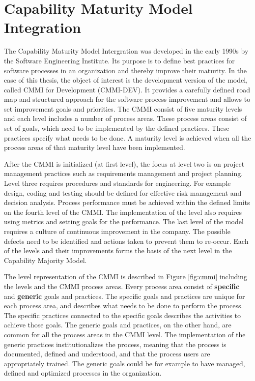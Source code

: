 \documentclass[12pt,a4paper,oneside,pdftex]{report}
\begin{document}
\section{Capability Maturity Model Integration}
The Capability Maturity Model Intergration was developed in the early 1990s by the Software Engineering Institute. Its purpose is to define best practices for software processes in an organization and thereby improve their maturity. In the case of this thesis, the object of interest is the development version of the model, called CMMI for Development (CMMI-DEV). It provides a carefully defined road map and  structured approach for the software process improvement and allows to set improvement goals and priorities. The CMMI consist of five maturity levels and each level includes a number of process areas. These process areas consist of set of goals, which need to be implemented by the defined practices. These practices specify what needs to be done. A maturity level is achieved when all the process areas of that maturity level have been implemented. \cite{RefWorks:29}

After the CMMI is initialized (at first level), the focus at level two is on project management practices such as requirements management and project planning. Level three requires procedures and standards for engineering. For example design, coding and testing should be defined for effective risk management and decision analysis. Process performance must be achieved within the defined limits on the fourth level of the CMMI. The implementation of the level also requires using metrics and setting goals for the performance. The last level of the model requires a culture of continuous improvement in the company. The possible defects need to be identified and actions taken to prevent them to re-occur. Each of the levels and their improvements forms the basis of the next level in the Capability Majority Model. \cite{RefWorks:29}

The level representation of the CMMI is described in Figure \ref{fig:cmmi} including the levels and the CMMI process areas. Every process area consist of \textbf{specific} and \textbf{generic} goals and practices. The specific goals and practices are unique for each process area, and describes what needs to be done to perform the process. The specific practices connected to the specific goals describes the activities to achieve those goals. The generic goals and practices, on the other hand, are common for all the process areas in the CMMI level. The implementation of the generic practices institutionalizes the process, meaning that the process is documented, defined and understood, and that the process users are appropriately trained. The generic goals could be for example to have managed, defined and optimized processes in the organization. \cite{RefWorks:29}	
\end{document}
